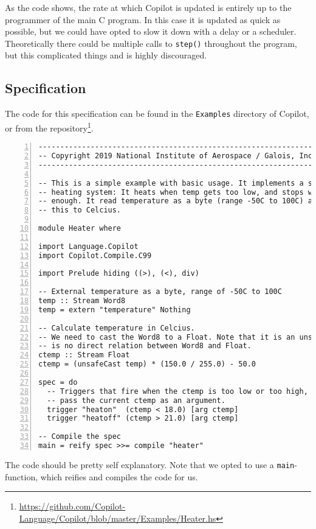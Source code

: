 As the code shows, the rate at which Copilot is updated is entirely up to the
programmer of the main C program. In this case it is updated as quick as
possible, but we could have opted to slow it down with a delay or a scheduler.
Theoretically there could be multiple calls to \texttt{step()} throughout the
program, but this complicated things and is highly discouraged.


\subsection{Specification}
The code for this specification can be found in the \texttt{Examples} directory
of Copilot, or from the
repository\footnote{\url{https://github.com/Copilot-Language/Copilot/blob/master/Examples/Heater.hs}}.

\begin{lstlisting}[language = Copilot, frame = single, numbers = left]
--------------------------------------------------------------------------------
-- Copyright 2019 National Institute of Aerospace / Galois, Inc.
--------------------------------------------------------------------------------

-- This is a simple example with basic usage. It implements a simple home
-- heating system: It heats when temp gets too low, and stops when it is high
-- enough. It read temperature as a byte (range -50C to 100C) and translates
-- this to Celcius.

module Heater where

import Language.Copilot
import Copilot.Compile.C99

import Prelude hiding ((>), (<), div)

-- External temperature as a byte, range of -50C to 100C
temp :: Stream Word8
temp = extern "temperature" Nothing

-- Calculate temperature in Celcius.
-- We need to cast the Word8 to a Float. Note that it is an unsafeCast, as there
-- is no direct relation between Word8 and Float.
ctemp :: Stream Float
ctemp = (unsafeCast temp) * (150.0 / 255.0) - 50.0

spec = do
  -- Triggers that fire when the ctemp is too low or too high,
  -- pass the current ctemp as an argument.
  trigger "heaton"  (ctemp < 18.0) [arg ctemp]
  trigger "heatoff" (ctemp > 21.0) [arg ctemp]

-- Compile the spec
main = reify spec >>= compile "heater"
\end{lstlisting}
The code should be pretty self explanatory. Note that we opted to use a
\texttt{main}-function, which reifies and compiles the code for us.

